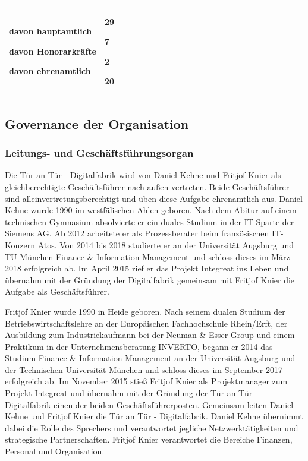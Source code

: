 \documentclass[12pt, a4paper]{article} %
\begin{document}
\begin{longtable}[]{@{}ll@{}}
\begin{minipage}[t]{0.47\columnwidth}
davon hauptamtlich

davon Honorarkräfte

davon ehrenamtlich\strut
\end{minipage} & \begin{minipage}[t]{0.47\columnwidth}\raggedright
29

7

2

20\strut
\end{minipage}\tabularnewline
\bottomrule
\end{longtable}

\hypertarget{governance-der-organisation}{%
\subsection{Governance der
Organisation}\label{governance-der-organisation}}

\hypertarget{leitungs--und-geschuxe4ftsfuxfchrungsorgan}{%
\subsubsection{Leitungs- und
Geschäftsführungsorgan}\label{leitungs--und-geschuxe4ftsfuxfchrungsorgan}}

Die Tür an Tür - Digitalfabrik wird von Daniel Kehne und Fritjof Knier
als gleichberechtigte Geschäftsführer nach außen vertreten. Beide
Geschäftsführer sind alleinvertretungsberechtigt und üben diese Aufgabe
ehrenamtlich aus. Daniel Kehne wurde 1990 im westfälischen Ahlen
geboren. Nach dem Abitur auf einem technischen Gymnasium absolvierte er
ein duales Studium in der IT-Sparte der Siemens AG. Ab 2012 arbeitete er
als Prozessberater beim französischen IT-Konzern Atos. Von 2014 bis 2018
studierte er an der Universität Augsburg und TU München Finance \&
Information Management und schloss dieses im März 2018 erfolgreich ab.
Im April 2015 rief er das Projekt Integreat ins Leben und übernahm mit
der Gründung der Digitalfabrik gemeinsam mit Fritjof Knier die Aufgabe
als Geschäftsführer.

Fritjof Knier wurde 1990 in Heide geboren. Nach seinem dualen Studium
der Betriebswirtschaftslehre an der Europäischen Fachhochschule
Rhein/Erft, der Ausbildung zum Industriekaufmann bei der Neuman \& Esser
Group und einem Praktikum in der Unternehmensberatung INVERTO, begann er
2014 das Studium Finance \& Information Management an der Universität
Augsburg und der Technischen Universität München und schloss dieses im
September 2017 erfolgreich ab. Im November 2015 stieß Fritjof Knier als
Projektmanager zum Projekt Integreat und übernahm mit der Gründung der
Tür an Tür - Digitalfabrik einen der beiden Geschäftsführerposten.
Gemeinsam leiten Daniel Kehne und Fritjof Knier die Tür an Tür -
Digitalfabrik. Daniel Kehne übernimmt dabei die Rolle des Sprechers und
verantwortet jegliche Netzwerktätigkeiten und strategische
Partnerschaften. Fritjof Knier verantwortet die Bereiche Finanzen,
Personal und Organisation.
\end{document}
